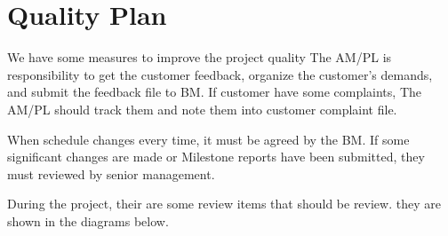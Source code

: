 \documentclass[a4paper,11pt]{article}
\begin{document}
\section{Quality Plan}
We have some measures to improve the project quality The AM/PL is responsibility to get the customer feedback, 
organize the customer's demands, and submit the feedback file to BM.
If customer have some complaints, The AM/PL should track them and note them into customer complaint file. 

When schedule changes every time, it must be agreed by the BM. 
If some significant changes are made or Milestone reports have been submitted, they must reviewed by senior management.

During the project, their are some review items that should be review. they are shown in the diagrams below.
\end{document}
